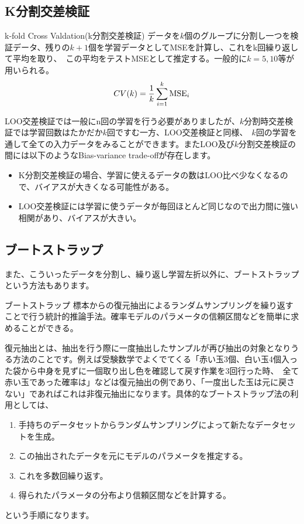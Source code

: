\documentclass[uplatex]{jsarticle}
\begin{document}
\subsection{K分割交差検証}
\begin{itembox}[l]{k-fold Cross Valdation(k分割交差検証)}
  データを$k$個のグループに分割し一つを検証データ、残りの$k+1$個を学習データとしてMSEを計算し、これをk回繰り返して平均を取り、\
  この平均をテストMSEとして推定する。一般的に$k=5, 10$等が用いられる。
  $$CV(k) = \frac{1}{k}\sum_{i=1}^k {\rm MSE}_i$$
\end{itembox}
LOO交差検証では一般にn回の学習を行う必要がありましたが、$k$分割時交差検証では学習回数はたかだか$k$回ですむ一方、LOO交差検証と同様、\
$k$回の学習を通して全ての入力データをみることができます。またLOO及び$k$分割交差検証の間には以下のようなBias-variance trade-offが存在します。
  \begin{itemize}
    \item K分割交差検証の場合、学習に使えるデータの数はLOO比べ少なくなるので、バイアスが大きくなる可能性がある。
    \item LOO交差検証には学習に使うデータが毎回ほとんど同じなので出力間に強い相関があり、バイアスが大きい。
  \end{itemize}

\subsection{ブートストラップ}
また、こういったデータを分割し、繰り返し学習左折以外に、ブートストラップという方法もあります。
 \begin{itembox}[l]{ブートストラップ}
   標本からの復元抽出によるランダムサンプリングを繰り返すことで行う統計的推論手法。確率モデルのパラメータの信頼区間などを簡単に求めることができる。
 \end{itembox}
 復元抽出とは、抽出を行う際に一度抽出したサンプルが再び抽出の対象となりうる方法のことです。例えば受験数学でよくでてくる「赤い玉3個、白い玉4個入った袋から中身を見ずに一個取り出し色を確認して戻す作業を3回行った時、\
 全て赤い玉であった確率は」などは復元抽出の例であり、「一度出した玉は元に戻さない」であればこれは非復元抽出になります。具体的なブートストラップ法の利用としては、
 \begin{enumerate}
   \item 手持ちのデータセットからランダムサンプリングによって新たなデータセットを生成。
   \item この抽出されたデータを元にモデルのパラメータを推定する。
   \item これを多数回繰り返す。
   \item 得られたパラメータの分布より信頼区間などを計算する。
 \end{enumerate}
という手順になります。
\end{document}
